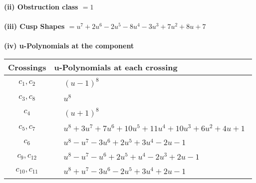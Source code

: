 \documentclass[1p]{elsarticle_modified}
\theoremstyle{definition}
\begin{document}
\flushleft \textbf{(ii) Obstruction class $= 1$}\\~\\
\flushleft \textbf{(iii) Cusp Shapes $= u^7+2 u^6-2 u^5-8 u^4-3 u^3+7 u^2+8 u+7$}\\~\\
\newpage\renewcommand{\arraystretch}{1}
\flushleft \textbf{(iv) u-Polynomials at the component}\newline \\
\begin{tabular}{m{50pt}|m{274pt}}
Crossings & \hspace{64pt}u-Polynomials at each crossing \\
\hline $$\begin{aligned}c_{1},c_{2}\end{aligned}$$&$\begin{aligned}
&(u-1)^8
\end{aligned}$\\
\hline $$\begin{aligned}c_{3},c_{8}\end{aligned}$$&$\begin{aligned}
&u^8
\end{aligned}$\\
\hline $$\begin{aligned}c_{4}\end{aligned}$$&$\begin{aligned}
&(u+1)^8
\end{aligned}$\\
\hline $$\begin{aligned}c_{5},c_{7}\end{aligned}$$&$\begin{aligned}
&u^8+3 u^7+7 u^6+10 u^5+11 u^4+10 u^3+6 u^2+4 u+1
\end{aligned}$\\
\hline $$\begin{aligned}c_{6}\end{aligned}$$&$\begin{aligned}
&u^8- u^7-3 u^6+2 u^5+3 u^4-2 u-1
\end{aligned}$\\
\hline $$\begin{aligned}c_{9},c_{12}\end{aligned}$$&$\begin{aligned}
&u^8- u^7- u^6+2 u^5+u^4-2 u^3+2 u-1
\end{aligned}$\\
\hline $$\begin{aligned}c_{10},c_{11}\end{aligned}$$&$\begin{aligned}
&u^8+u^7-3 u^6-2 u^5+3 u^4+2 u-1
\end{aligned}$\\
\hline
\end{tabular}\\~\\
\end{document}
